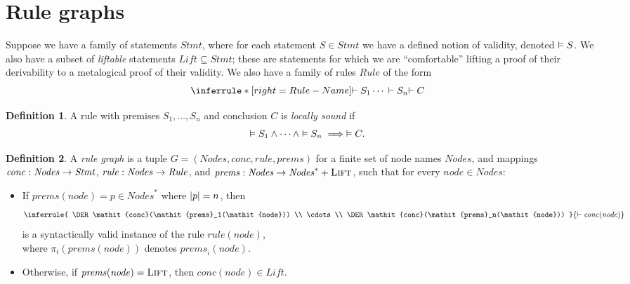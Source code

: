 \documentclass[10pt]{article}
\theoremstyle{definition}
\newtheorem{definition}{Definition}
\begin{document}
\section{Rule graphs}

\newcommand*{\DomLiftable}{\mathit{Lift}}
\newcommand*{\DomStmt}{\mathit{Stmt}}
\newcommand*{\DomRule}{\mathit{Rule}}
\newcommand*{\LIFT}{\textsc{Lift}}

Suppose we have a family of statements $\DomStmt$,
where for each statement $S \in \DomStmt$
we have a defined notion of validity,
denoted $\vDash S$.
%
We also have a subset of \emph{liftable} statements
$\DomLiftable \subseteq \DomStmt$;
these are statements for which
we are ``comfortable'' lifting a proof of their derivability
to a metalogical proof of their validity.
%
We also have a family of rules $\DomRule$ of the form
\[
    \inferrule*[right=Rule-Name]{
        \DER S_1 \\ \cdots \\ \DER S_n
    }{
        \DER C
    }
\]
%
\begin{definition}
    A rule with premises $S_1,\dots,S_n$ and conclusion $C$ is \emph{locally sound} if
    \[\vDash S_1 \wedge \cdots \wedge \vDash S_n \implies \vDash C.\]
\end{definition}
%

\newcommand*{\DomNode}{\mathit{Nodes}}
\newcommand*{\node}{\mathit{node}}
\newcommand*{\MapConc}{\mathit{conc}}
\newcommand*{\MapRule}{\mathit{rule}}
\newcommand*{\MapPrems}{\mathit{prems}}

\begin{definition}
A \emph{rule graph} is a tuple $G=(\DomNode,\MapConc,\MapRule,\MapPrems)$ for a
finite set of node names $\DomNode$,
and mappings %
    $\MapConc : \DomNode \ra \DomStmt$,
    $\MapRule : \DomNode \ra \DomRule$,
 and   $\MapPrems : \DomNode \ra \DomNode^* + \LIFT$,
such that for every $\node \in \DomNode$:
\begin{itemize}
\item If $\MapPrems(\node) = p \in \DomNode^*$
    where $\left|p\right| = n$, then
    \[
        \inferrule{
            \DER \MapConc(\MapPrems_1(\node))
            \\ \cdots \\
            \DER \MapConc(\MapPrems_n(\node))
        }{ \DER \MapConc(\node) }
    \]
    is a syntactically valid instance of
    the rule $\MapRule(\node)$,\\
    where $\pi_i(\MapPrems(\node))$
    denotes $\MapPrems_i(\node)$.
\item Otherwise, if $\MapPrems(\node) = \LIFT$,
    then $\MapConc(\node) \in \DomLiftable$.
\end{itemize}
\end{definition}
\end{document}
